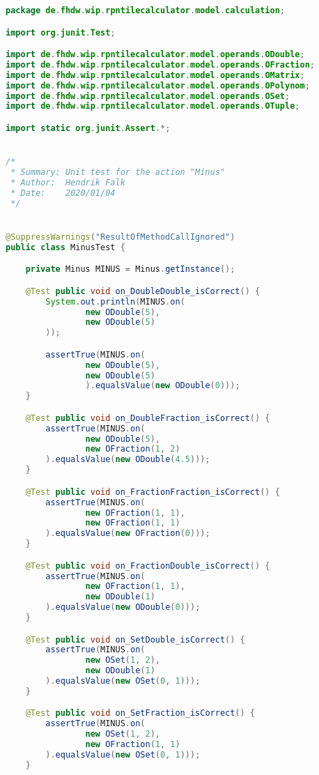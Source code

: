 \begin{lstlisting}[caption=MinusTest (Falk),label=list:MinusTest,language=Java]
package de.fhdw.wip.rpntilecalculator.model.calculation;

import org.junit.Test;

import de.fhdw.wip.rpntilecalculator.model.operands.ODouble;
import de.fhdw.wip.rpntilecalculator.model.operands.OFraction;
import de.fhdw.wip.rpntilecalculator.model.operands.OMatrix;
import de.fhdw.wip.rpntilecalculator.model.operands.OPolynom;
import de.fhdw.wip.rpntilecalculator.model.operands.OSet;
import de.fhdw.wip.rpntilecalculator.model.operands.OTuple;

import static org.junit.Assert.*;


/*
 * Summary: Unit test for the action "Minus"
 * Author:  Hendrik Falk
 * Date:    2020/01/04
 */


@SuppressWarnings("ResultOfMethodCallIgnored")
public class MinusTest {

    private Minus MINUS = Minus.getInstance();

    @Test public void on_DoubleDouble_isCorrect() {
        System.out.println(MINUS.on(
                new ODouble(5),
                new ODouble(5)
        ));

        assertTrue(MINUS.on(
                new ODouble(5),
                new ODouble(5)
                ).equalsValue(new ODouble(0)));
    }

    @Test public void on_DoubleFraction_isCorrect() {
        assertTrue(MINUS.on(
                new ODouble(5),
                new OFraction(1, 2)
        ).equalsValue(new ODouble(4.5)));
    }

    @Test public void on_FractionFraction_isCorrect() {
        assertTrue(MINUS.on(
                new OFraction(1, 1),
                new OFraction(1, 1)
        ).equalsValue(new OFraction(0)));
    }

    @Test public void on_FractionDouble_isCorrect() {
        assertTrue(MINUS.on(
                new OFraction(1, 1),
                new ODouble(1)
        ).equalsValue(new ODouble(0)));
    }

    @Test public void on_SetDouble_isCorrect() {
        assertTrue(MINUS.on(
                new OSet(1, 2),
                new ODouble(1)
        ).equalsValue(new OSet(0, 1)));
    }

    @Test public void on_SetFraction_isCorrect() {
        assertTrue(MINUS.on(
                new OSet(1, 2),
                new OFraction(1, 1)
        ).equalsValue(new OSet(0, 1)));
    }


\end{lstlisting}
